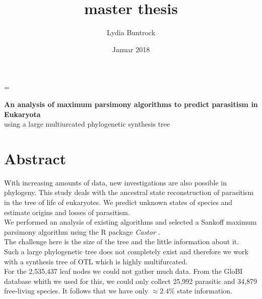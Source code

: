 
\author{Lydia Buntrock}
\title{master thesis}
\date{Januar 2018}

\hfuzz=\maxdimen {} 



  \begin{titlepage}
    \pagestyle{empty}
  	
    	\vspace{20mm}
    	\begin{Large}
          \textbf{An analysis of maximum parsimony algorithms to predict parasitism in Eukaryota}\\
          using a large multiurcated phylogenetic synthesis tree
      \end{Large}

  	\clearpage
  \end{titlepage}

\chapter*{Abstract}
  With increasing amounts of data, new investigations are also possible in phylogeny. This study 
    deals with the ancestral state reconstruction of parasitism in the tree of life of eukaryotes. 
    We predict unknown states of species and estimate origins and losses of parasitism. \\
  We performed an analysis of existing algorithms and selected a Sankoff maximum parsimony algorithm 
    using the R package \textit{Castor} \cite{Louca2017}. \\
  The challenge here is the size of the tree and the little information about it. \\
  Such a large phylogenetic tree does not completely exist and therefore we work with a synthesis 
    tree of OTL \cite{Hinchliff2015} which is highly multifurcated. \\
  For the 2,535,437 leaf nodes we could not gather much data. From the GloBI database 
    \cite{Poelen2014} whith we used for this, we could only collect 25,992 parasitic and 34,879 
    free-living species. It follows that we have only $\approx 2.4\%$ state information. \\

